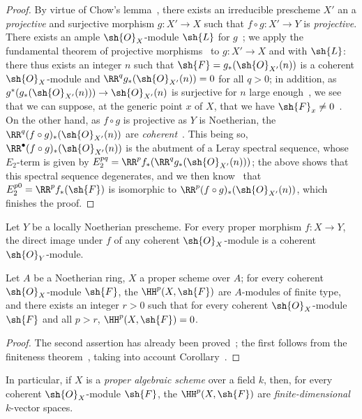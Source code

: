 \begin{proof}
By virtue of Chow's lemma~, there exists an irreducible prescheme $X'$ an a \emph{projective} and surjective morphism $g:X'\to X$ such that $f\circ g:X'\to Y$ is \emph{projective}.
There exists an ample $\sh{O}_X$-module $\sh{L}$ for $g$~; we apply the fundamental theorem of projective morphisms~ to $g:X'\to X$ and with $\sh{L}$: there thus exists an integer $n$ such that $\sh{F}=g_*(\sh{O}_{X'}(n))$ is a coherent $\sh{O}_X$-module and $\RR^q g_*(\sh{O}_{X'}(n))=0$ for all $q>0$; in addition, as $g^*(g_*(\sh{O}_{X'}(n)))\to\sh{O}_{X'}(n)$ is surjective for $n$ large enough~, we see that we can suppose, at the generic point $x$ of $X$, that we have $\sh{F}_x\neq 0$~.
On the other hand, as $f\circ g$ is projective as $Y$ is Noetherian, the $\RR^q(f\circ g)_*(\sh{O}_{X'}(n))$ are \emph{coherent}~.
This being so, $\RR^\bullet(f\circ g)_*(\sh{O}_{X'}(n))$ is the abutment of a Leray spectral sequence, whose $E_2$-term is given by $E_2^{pq}=\RR^p f_*(\RR^q g_*(\sh{O}_{X'}(n)))$; the above shows that this spectral sequence degenerates, and we then know~ that $E_2^{p0}=\RR^p f_*(\sh{F})$ is isomorphic to $\RR^p(f\circ g)_*(\sh{O}_{X'}(n))$, which finishes the proof.
\end{proof}

\begin{corollary}[3.2.2]
\label{III.3.2.2}
Let $Y$ be a locally Noetherian prescheme.
For every proper morphism $f:X\to Y$, the direct image under $f$ of any coherent $\sh{O}_X$-module is a coherent $\sh{O}_Y$-module.
\end{corollary}

\begin{corollary}[3.2.3]
\label{III.3.2.3}
Let $A$ be a Noetherian ring, $X$ a proper scheme over $A$; for every coherent $\sh{O}_X$-module $\sh{F}$, the $\HH^p(X,\sh{F})$ are $A$-modules of finite type, and there exists an integer $r>0$ such that for every coherent $\sh{O}_X$-module $\sh{F}$ and all $p>r$, $\HH^p(X,\sh{F})=0$.
\end{corollary}

\begin{proof}
The second assertion has already been proved~; the first follows from the finiteness theorem~, taking into account Corollary~.
\end{proof}

In particular, if $X$ is a \emph{proper algebraic scheme} over a field $k$, then, for every coherent $\sh{O}_X$-module $\sh{F}$, the $\HH^p(X,\sh{F})$ are \emph{finite-dimensional} $k$-vector spaces.

